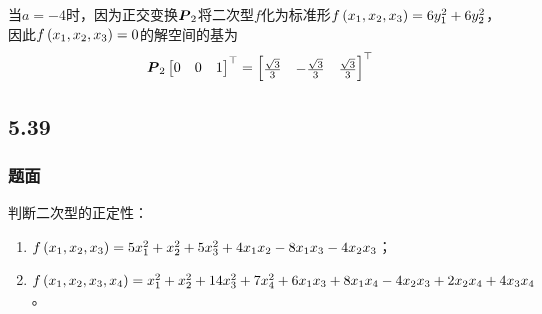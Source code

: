 \documentclass[9pt,xcolor=svgnames]{beamer} %
\begin{document}
\begin{frame}[allowframebreaks]
\begin{enumerate}
{              当\(a=-4\)时，因为正交变换\(\boldsymbol{P}_2\)将二次型\(f\)化为标准形\(f\left( x_1,x_2,x_3 \right)=6y_1^2+6y_2^2\)，因此\(f\left( x_1,x_2,x_3 \right)=0\)的解空间的基为
              \begin{equation*}
                  \boldsymbol{P}_2\begin{bmatrix}0&0&1\end{bmatrix}^\top=\begin{bmatrix}\frac{\sqrt{3}}{3}&-\frac{\sqrt{3}}{3}&\frac{\sqrt{3}}{3}\end{bmatrix}^\top
              \end{equation*}
              }
    \end{enumerate}
\end{frame}

\subsection*{5.39}
\begin{frame}
    \frametitle{题面}
    判断二次型的正定性：
    \begin{enumerate}
        \item \(f\left( x_1,x_2,x_3 \right)=5x_1^2+x_2^2+5x_3^2+4x_1x_2-8x_1x_3-4x_2x_3\)；
        \item \(f\left( x_1,x_2,x_3,x_4 \right)=x_1^2+x_2^2+14x_3^2+7x_4^2+6x_1x_3+8x_1x_4-4x_2x_3+2x_2x_4+4x_3x_4\)。
    \end{enumerate}
\end{frame}
\end{document}
